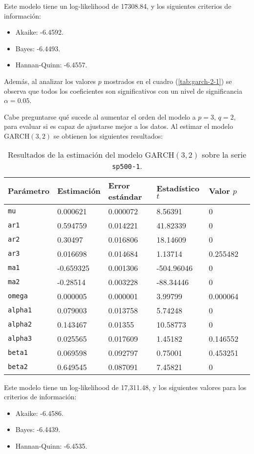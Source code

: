 \documentclass{article}
\begin{document}
Este modelo tiene un log-likelihood de 17308.84, y los siguientes criterios de información:
\begin{itemize}
\item Akaike: -6.4592.
\item Bayes: -6.4493.
\item Hannan-Quinn: -6.4557.
\end{itemize}

Además, al analizar los valores $p$ mostrados en el cuadro (\ref{tab:garch-2-1}) se observa que todos los coeficientes son significativos con un nivel de significancia $\alpha=0.05$.

Cabe preguntarse qué sucede al aumentar el orden del modelo a $p=3$, $q=2$, para evaluar si es capaz de ajustarse mejor a los datos. Al estimar el modelo $\mathrm{GARCH}(3, 2)$ se obtienen los siguientes resultados:

\begin{table}[H]
\centering
\begin{tabularx}{0.9\textwidth}{XXXXXX}
\toprule
Parámetro & Estimación & Error estándar & Estadístico $t$ & Valor $p$ \\
\midrule
\texttt{mu}&0.000621&0.000072&8.56391&0\\
\texttt{ar1}&0.594759&0.014221&41.82339&0\\
\texttt{ar2}&0.30497&0.016806&18.14609&0\\
\texttt{ar3}&0.016698&0.014684&1.13714&0.255482\\
\texttt{ma1}&-0.659325&0.001306&-504.96046&0\\
\texttt{ma2}&-0.28514&0.003228&-88.34446&0\\
\texttt{omega}&0.000005&0.000001&3.99799&0.000064\\
\texttt{alpha1}&0.079003&0.013758&5.74248&0\\
\texttt{alpha2}&0.143467&0.01355&10.58773&0\\
\texttt{alpha3}&0.025565&0.017609&1.45182&0.146552\\
\texttt{beta1}&0.069598&0.092797&0.75001&0.453251\\
\texttt{beta2}&0.649545&0.087091&7.45821&0\\
\bottomrule
\end{tabularx}
\caption{\label{tab:garch-3-2}Resultados de la estimación del modelo $\mathrm{GARCH}(3, 2)$ sobre la serie \texttt{sp500-1}.}
\end{table}

Este modelo tiene un log-likelihood de 17,311.48, y los siguientes valores para los criterios de información:
\begin{itemize}
\item Akaike: -6.4586.
\item Bayes: -6.4439.
\item Hannan-Quinn: -6.4535.
\end{itemize}
\end{document}
